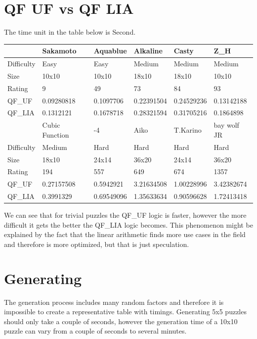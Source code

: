 \section{QF UF vs QF LIA}
The time unit in the table below is Second.
\begin{center}
  \begin{tabular}{ | l | l | l | l | l | l | }
    \hline
     			 & Sakamoto & Aquablue 	& Alkaline 	& Casty		& Z\_H \\ \hline
    Difficulty 	& Easy 		& Easy 		& Medium 	& Medium 	& Medium \\ \hline
    Size 		& 10x10		& 10x10		& 18x10		& 18x10		& 10x10 \\ \hline
    Rating		& 9			& 49		& 73		& 84		& 93 \\ \hline
    QF\_UF		& 0.09280818& 0.1097706	& 0.22391504 & 0.24529236	& 0.13142188 \\ \hline
    QF\_LIA		& 0.1312121	& 0.1678718	& 0.28321594 & 0.31705216	& 0.1864898 \\ \hline
    \hline
     			& Cubic Function & -4 	& Aiko 	& T.Karino		& bay wolf JR \\ \hline
    Difficulty 	& Medium 		& Hard 		& Hard 	& Hard 		& Hard \\ \hline
    Size 		& 18x10			& 24x14		& 36x20	& 24x14		& 36x20 \\ \hline
    Rating		& 194			& 557		& 649	& 674		& 1357 \\ \hline
    QF\_UF		& 0.27157508	& 0.5942921	& 3.21634508 & 1.00228996		& 3.42382674 \\ \hline
    QF\_LIA		& 0.3991329		& 0.69549096 & 1.35633634 & 0.90596628		& 1.72413418 \\ \hline
  \end{tabular}
\end{center}

We can see that for trivial puzzles the QF\_UF logic is faster, however the more difficult it gets the better the QF\_LIA logic becomes. This phenomenon might be explained by the fact that the linear arithmetic finds more use cases in the field and therefore is more optimized, but that is just speculation.

\section{Generating}
The generation process includes many random factors and therefore it is impossible to create a representative table with timings. Generating 5x5 puzzles should only take a couple of seconds, however the generation time of a 10x10 puzzle can vary from a couple of seconds to several minutes.

